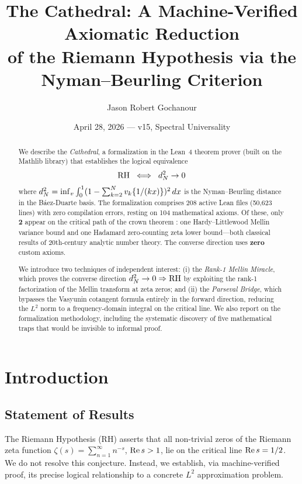 \documentclass[11pt,a4paper]{article}
\title{%
  The Cathedral: A Machine-Verified Axiomatic Reduction\\
  of the Riemann Hypothesis via the Nyman--Beurling Criterion%
}
\author{
  Jason Robert Gochanour
}
\date{April 28, 2026 --- v15, Spectral Universality}
\begin{document}
\maketitle

\begin{abstract}
We describe the \emph{Cathedral}, a formalization in the Lean~4 theorem
prover (built on the Mathlib library) that establishes the logical
equivalence
\[
  \mathrm{RH} \;\iff\; d_N^2 \to 0
\]
where $d_N^2 = \inf_{v} \int_0^1 (1 - \sum_{k=2}^N v_k \{1/(kx)\})^2\,dx$
is the Nyman--Beurling distance in the B\'aez-Duarte basis. The
formalization comprises 208 active Lean files (50{,}623 lines) with zero
compilation errors, resting on 104 mathematical axioms. Of these, only
\textbf{2} appear on the critical path of the crown theorem
: one Hardy--Littlewood Mellin variance
bound and one Hadamard zero-counting zeta lower bound---both classical
results of 20th-century analytic number theory.
The converse direction uses \textbf{zero} custom axioms.

We introduce two techniques of independent interest: (i) the
\emph{Rank-1 Mellin Miracle}, which proves the converse direction
$d_N^2 \to 0 \Rightarrow \mathrm{RH}$ by exploiting the rank-1 factorization
of the Mellin transform at zeta zeros; and (ii) the \emph{Parseval Bridge},
which bypasses the Vasyunin cotangent formula entirely in the forward
direction, reducing the $L^2$ norm to a frequency-domain integral on the
critical line. We also report on the formalization methodology,
including the systematic discovery of five mathematical traps that
would be invisible to informal proof.
\end{abstract}

\tableofcontents

\section{Introduction}

\subsection{Statement of Results}

The Riemann Hypothesis (RH) asserts that all non-trivial zeros of the
Riemann zeta function $\zeta(s) = \sum_{n=1}^\infty n^{-s}$, $\operatorname{Re} s > 1$,
lie on the critical line $\operatorname{Re} s = 1/2$. We do not resolve this
conjecture. Instead, we establish, via machine-verified proof, its
precise logical relationship to a concrete $L^2$ approximation problem.
\end{document}
